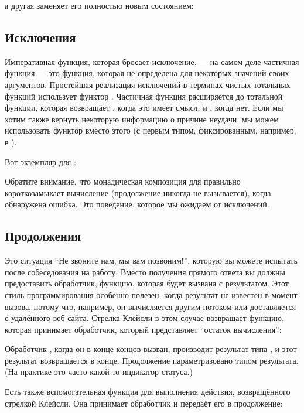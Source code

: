 а другая заменяет его полностью новым состоянием:


\subsection{Исключения}

Императивная функция, которая бросает исключение, --- на самом деле частичная
функция --- это функция, которая не определена для некоторых значений своих
аргументов. Простейшая реализация исключений в терминах чистых
тотальных функций использует функтор . Частичная функция
расширяется до тотальной функции, которая возвращает , когда это
имеет смысл, и , когда нет. Если мы хотим также
вернуть некоторую информацию о причине неудачи, мы можем использовать
функтор  вместо этого (с первым типом, фиксированным, например,
в ).

Вот экземпляр  для :

Обратите внимание, что монадическая композиция для  правильно
короткозамыкает вычисление (продолжение  никогда не
вызывается), когда обнаружена ошибка. Это поведение, которое мы ожидаем от
исключений.

\subsection{Продолжения}

Это ситуация ``Не звоните нам, мы вам позвоним!'', которую вы можете испытать
после собеседования на работу. Вместо получения прямого ответа вы
должны предоставить обработчик, функцию, которая будет вызвана с результатом.
Этот стиль программирования особенно полезен, когда результат не
известен в момент вызова, потому что, например, он
вычисляется другим потоком или доставляется с удалённого веб-сайта.
Стрелка Клейсли в этом случае возвращает функцию, которая принимает обработчик,
который представляет ``остаток вычисления'':

Обработчик , когда он в конце концов вызван,
производит результат типа , и этот результат возвращается в
конце. Продолжение параметризовано типом результата. (На
практике это часто какой-то индикатор статуса.)

Есть также вспомогательная функция для выполнения действия, возвращённого
стрелкой Клейсли. Она принимает обработчик и передаёт его в продолжение:

